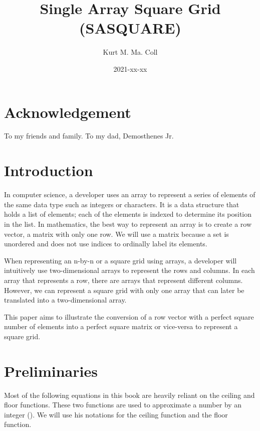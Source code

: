 \documentclass[letterpaper, twoside,12pt]{book}
\title{Single Array Square Grid (SASQUARE)}
\date{2021-xx-xx}
\author{Kurt M. Ma. Coll}
\begin{document}

    \maketitle
    \newpage

    \chapter*{Acknowledgement} %
    \label{cha:acknowledgement}
    To my friends and family. To my dad, Demosthenes Jr.

    \newpage

    \tableofcontents
    \newpage

    \chapter*{Introduction}
    In computer science, a developer uses an array to represent a series of elements of the same data type such as integers or characters. It is a data structure that holds a list of elements; each of the elements is indexed to determine its position in the list. In mathematics, the best way to represent an array is to create a row vector, a matrix with only one row. We will use a matrix because a set is unordered and does not use indices to ordinally label its elements.

    When representing an n-by-n or a square grid using arrays, a developer will intuitively use two-dimensional arrays to represent the rows and columns. In each array that represents a row, there are arrays that represent different columns. However, we can represent a square grid with only one array that can later be translated into a two-dimensional array.

    This paper aims to illustrate the conversion of a row vector with a perfect square number of elements into a perfect square matrix or vice-versa to represent a square grid.

    \newpage
    \setcounter{chapter}{-1}

    \chapter{Preliminaries}
    Most of the following equations in this book are heavily reliant on the ceiling and floor functions. These two functions are used to approximate a number by an integer (\cite{iverson_notation}). We will use his notations for the ceiling function and the floor function.
\end{document}

